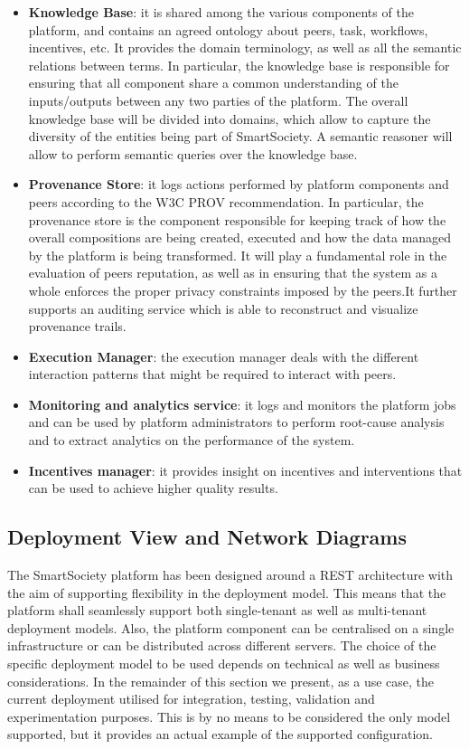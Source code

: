 \begin{itemize}
\item \textbf{Knowledge Base}: it is shared among the various components of the platform, and contains an agreed ontology about peers, task, workflows, incentives, etc. It provides the domain terminology, as well as all the semantic relations between terms. In particular, the knowledge base is responsible for ensuring that all component share a common understanding of the inputs/outputs between any two parties of the platform. The overall knowledge base will be divided into domains, which allow to capture the diversity of the entities being part of SmartSociety. A semantic reasoner will allow to perform semantic queries over the knowledge base.

\item \textbf{Provenance Store}: it logs actions performed by platform
components and peers according to the W3C PROV recommendation. In particular, the provenance store is the component responsible for keeping track of how the overall compositions are being created, executed and how the data managed by the platform is being transformed. It will play a fundamental role in the evaluation of peers reputation, as well as in ensuring that the system as a whole enforces the proper privacy constraints imposed by the peers.It further supports an auditing service which is able to reconstruct and visualize provenance trails. 

\item \textbf{Execution Manager}: the execution manager deals with the different interaction patterns that might be required to interact with peers.
\item {\bf Monitoring and analytics service}: it logs and monitors
the platform jobs and can be used by platform administrators to
perform root-cause analysis and to extract analytics on the
performance of the system. 

\item {\bf Incentives manager}: it provides insight on incentives and
interventions that can be used to achieve higher quality results.
\end{itemize} 	


\subsection{Deployment View and Network Diagrams}
The SmartSociety platform has been designed around a REST architecture
with the aim of supporting flexibility in the deployment model. This
means that the platform shall seamlessly support both single-tenant as
well as multi-tenant deployment models. Also, the platform component
can be centralised on a single infrastructure or can be distributed
across different servers. The choice of the specific deployment model
to be used depends on technical as well as business considerations. In
the remainder of this section we present, as a use case, the current
deployment utilised for integration, testing, validation and
experimentation purposes. This is by no means to be considered the
only model supported, but it provides an actual example of the
supported configuration. 

